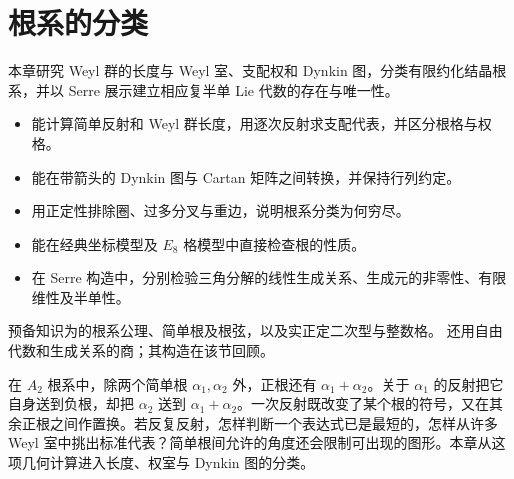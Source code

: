 
\chapter{根系的分类}
\label{b5:ch:17}

\begin{chapterabstract}
	本章研究 Weyl 群的长度与 Weyl 室、支配权和 Dynkin 图，分类有限约化结晶根系，并以 Serre 展示建立相应复半单 Lie 代数的存在与唯一性。
\end{chapterabstract}

\begin{learninggoals}
	\begin{itemize}
		\item 能计算简单反射和 Weyl 群长度，用逐次反射求支配代表，并区分根格与权格。
		\item 能在带箭头的 Dynkin 图与 Cartan 矩阵之间转换，并保持行列约定。
		\item 用正定性排除圈、过多分叉与重边，说明根系分类为何穷尽。
		\item 能在经典坐标模型及 \(E_8\) 格模型中直接检查根的性质。
		\item 在 Serre 构造中，分别检验三角分解的线性生成关系、生成元的非零性、有限维性及半单性。
	\end{itemize}
	预备知识为的根系公理、简单根及根弦，以及实正定二次型与整数格。 还用自由代数和生成关系的商；其构造在该节回顾。
\end{learninggoals}

在 \(A_2\) 根系中，除两个简单根 \(\alpha_1,\alpha_2\) 外，正根还有 \(\alpha_1+\alpha_2\)。关于 \(\alpha_1\) 的反射把它自身送到负根，却把 \(\alpha_2\) 送到 \(\alpha_1+\alpha_2\)。一次反射既改变了某个根的符号，又在其余正根之间作置换。若反复反射，怎样判断一个表达式已是最短的，怎样从许多 Weyl 室中挑出标准代表？简单根间允许的角度还会限制可出现的图形。本章从这项几何计算进入长度、权室与 Dynkin 图的分类。






